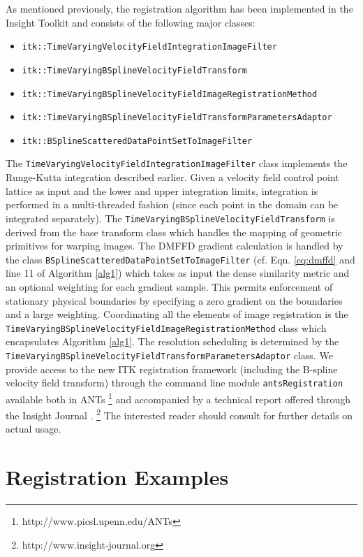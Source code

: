 \documentclass{llncs}
\begin{document}
As mentioned previously, the registration algorithm has been implemented in the
Insight Toolkit and consists of the following major classes: 
\begin{itemize}
  \item \verb#itk::TimeVaryingVelocityFieldIntegrationImageFilter#
  \item \verb#itk::TimeVaryingBSplineVelocityFieldTransform#
  \item \verb#itk::TimeVaryingBSplineVelocityFieldImageRegistrationMethod#
  \item \verb#itk::TimeVaryingBSplineVelocityFieldTransformParametersAdaptor#
  \item \verb#itk::BSplineScatteredDataPointSetToImageFilter#
\end{itemize}
The \verb#TimeVaryingVelocityFieldIntegrationImageFilter# class implements
the Runge-Kutta integration described earlier.  Given a 
velocity field control point lattice as 
input and the lower and upper integration limits, integration is performed 
in a multi-threaded fashion (since each point in the domain
can be integrated separately).  The \verb#TimeVaryingBSplineVelocityFieldTransform# 
is derived from the base transform class which handles the mapping of geometric primitives
for warping images.  The DMFFD gradient calculation  is handled by the class \verb#BSplineScatteredDataPointSetToImageFilter# (cf. Eqn. \ref{eq:dmffd} and line 11
of Algorithm \ref{alg1}) which takes as input the dense similarity metric and an optional
weighting for each gradient sample.  This permits enforcement of stationary physical
boundaries by specifying a zero gradient on the boundaries and a large weighting.
Coordinating all the elements of image registration is the
\verb#TimeVaryingBSplineVelocityFieldImageRegistrationMethod# class which
encapsulates Algorithm \ref{alg1}.  The resolution scheduling is determined
by the \verb#TimeVaryingBSplineVelocityFieldTransformParametersAdaptor# class.
We provide access to the new ITK 
registration framework (including the B-spline velocity field transform) 
through the command line module \verb#antsRegistration# available both in ANTs%
\footnote{
http://www.picsl.upenn.edu/ANTs
}
and accompanied by a technical report offered through the Insight Journal
\cite{tustison2012}.%
\footnote{
http://www.insight-journal.org
}
The interested reader should consult \cite{tustison2012} for further details on 
actual usage.

\section{Registration Examples}
\end{document}
